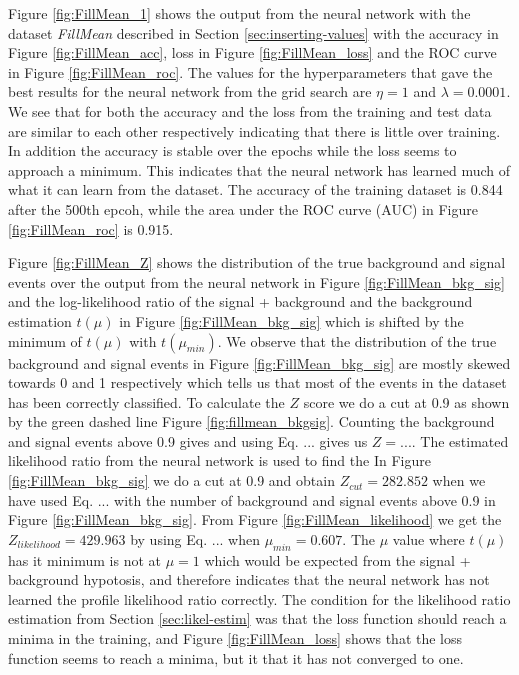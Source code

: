 \documentclass[../../main/main.tex]{subfiles}
\begin{document}
Figure \ref{fig:FillMean_1} shows the output from the neural network with the dataset \emph{FillMean} described in Section \ref{sec:inserting-values} with the accuracy in Figure \ref{fig:FillMean_acc}, loss in Figure \ref{fig:FillMean_loss} and the ROC curve in Figure \ref{fig:FillMean_roc}. The values for the hyperparameters that gave the best results for the neural network from the grid search are \(\eta=1\) and \(\lambda=0.0001\). We see that for both the accuracy and the loss from the training and test data are similar to each other respectively indicating that there is little over training. In addition the accuracy is stable over the epochs while the loss seems to approach a minimum. This indicates that the neural network has learned much of what it can learn from the dataset. The accuracy of the training dataset is 0.844 after the 500th epcoh, while the area under the ROC curve (AUC) in Figure \ref{fig:FillMean_roc} is 0.915.

Figure \ref{fig:FillMean_Z} shows the distribution of the true background and signal events over the output from the neural network in Figure \ref{fig:FillMean_bkg_sig} and the log-likelihood ratio of the signal + background and the background estimation \(t(\mu)\) in Figure \ref{fig:FillMean_bkg_sig} which is shifted by the minimum of \(t(\mu)\) with \(t(\mu_{min})\). We observe that the distribution of the true background and signal events in Figure \ref{fig:FillMean_bkg_sig} are mostly skewed towards 0 and 1 respectively which tells us that most of the events in the dataset has been correctly classified. To calculate the \(Z\) score we do a cut at 0.9 as shown by the green dashed line Figure \ref{fig:fillmean_bkgsig}. Counting the background and signal events above 0.9 gives and using Eq. ... gives us \(Z=...\). The estimated likelihood ratio from the neural network is used to find the
 In Figure \ref{fig:FillMean_bkg_sig} we do a cut at 0.9 and obtain \(Z_{cut} = 282.852\) when we have used Eq. ... with the number of background and signal events above 0.9 in Figure \ref{fig:FillMean_bkg_sig}. From Figure \ref{fig:FillMean_likelihood} we get the \(Z_{likelihood} = 429.963\) by using Eq. ... when \(\mu_{min} = 0.607\). The \(\mu\) value where \(t(\mu)\) has it minimum is not at \(\mu=1\) which would be expected from the signal + background hypotosis, and therefore indicates that the neural network has not learned the profile likelihood ratio correctly. The condition for the likelihood ratio estimation from Section \ref{sec:likel-estim} was that the loss function should reach a minima in the training, and Figure \ref{fig:FillMean_loss} shows that the loss function seems to reach a minima, but it that it has not converged to one.
\end{document}
